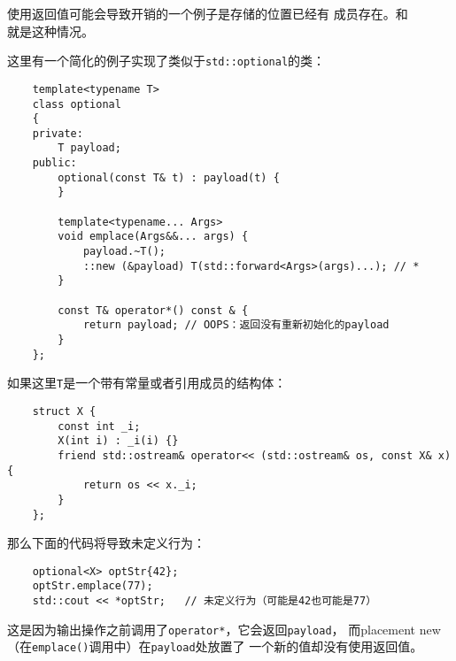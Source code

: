 使用返回值可能会导致开销的一个例子是存储的位置已经有
成员存在。和\\就是这种情况。

这里有一个简化的例子实现了类似于\texttt{std::optional}的类：
\begin{lstlisting}
    template<typename T>
    class optional
    {
    private:
        T payload;
    public:
        optional(const T& t) : payload(t) {
        }

        template<typename... Args>
        void emplace(Args&&... args) {
            payload.~T();
            ::new (&payload) T(std::forward<Args>(args)...); // *
        }

        const T& operator*() const & {
            return payload; // OOPS：返回没有重新初始化的payload
        }
    };
\end{lstlisting}
如果这里\texttt{T}是一个带有常量或者引用成员的结构体：
\begin{lstlisting}
    struct X {
        const int _i;
        X(int i) : _i(i) {}
        friend std::ostream& operator<< (std::ostream& os, const X& x) {
            return os << x._i;
        }
    };
\end{lstlisting}
那么下面的代码将导致未定义行为：
\begin{lstlisting}
    optional<X> optStr{42};
    optStr.emplace(77);
    std::cout << *optStr;   // 未定义行为（可能是42也可能是77）
\end{lstlisting}
这是因为输出操作之前调用了\texttt{operator*}，它会返回\texttt{payload}，
而placement new（在\texttt{emplace()}调用中）在\texttt{payload}处放置了
一个新的值却没有使用返回值。

